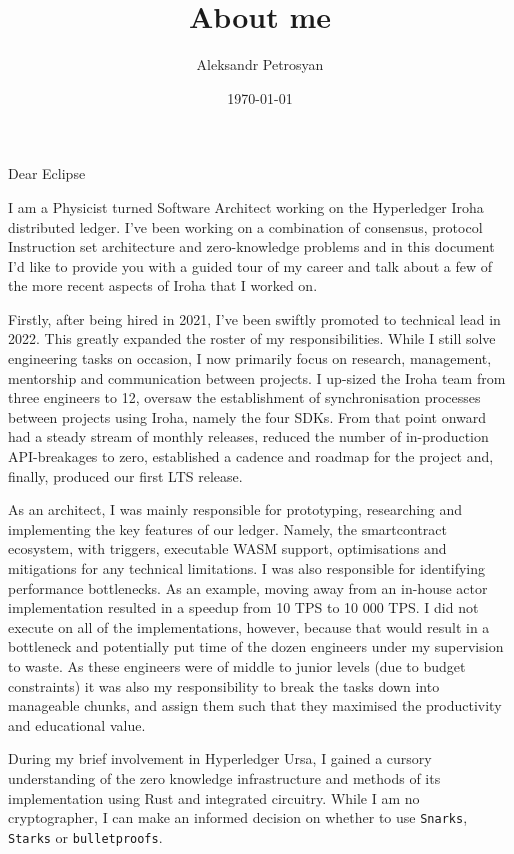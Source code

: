 \documentclass[11pt]{scrlttr2}
\author{Aleksandr Petrosyan}
\date{\today}
\title{About me}
\begin{document}
\begin{letter}{
}

\opening{Dear Eclipse}

I am a Physicist turned Software Architect working on the Hyperledger
Iroha distributed ledger.  I've been working on a combination of
consensus, protocol Instruction set architecture and zero-knowledge
problems and in this document I'd like to provide you with a guided
tour of my career and talk about a few of the more recent aspects of
Iroha that I worked on.

Firstly, after being hired in 2021, I've been swiftly promoted to
technical lead in 2022. This greatly expanded the roster of my
responsibilities. While I still solve engineering tasks on occasion, I
now primarily focus on research, management, mentorship and
communication between projects. I up-sized the Iroha team from three
engineers to 12, oversaw the establishment of synchronisation
processes between projects using Iroha, namely the four SDKs. From
that point onward had a steady stream of monthly releases, reduced the
number of in-production API-breakages to zero, established a cadence
and roadmap for the project and, finally, produced our first LTS
release.

As an architect, I was mainly responsible for prototyping, researching
and implementing the key features of our ledger. Namely, the
smartcontract ecosystem, with triggers, executable WASM support,
optimisations and mitigations for any technical limitations.  I was
also responsible for identifying performance bottlenecks. As an
example, moving away from an in-house actor implementation resulted in
a speedup from 10 TPS to 10 000 TPS. I did not execute on all of the
implementations, however, because that would result in a bottleneck
and potentially put time of the dozen engineers under my supervision
to waste.  As these engineers were of middle to junior levels (due to
budget constraints) it was also my responsibility to break the tasks
down into manageable chunks, and assign them such that they maximised
the productivity and educational value.

During my brief involvement in Hyperledger Ursa, I gained a cursory
understanding of the zero knowledge infrastructure and methods of its
implementation using Rust and integrated circuitry.  While I am no
cryptographer, I can make an informed decision on whether to use
\texttt{Snarks}, \texttt{Starks} or \texttt{bulletproofs}.


\end{letter}
\end{document}
